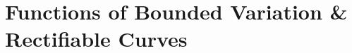 

\def\upint{\mathchoice%
    {\mkern13mu\overline{\vphantom{\intop}\mkern7mu}\mkern-20mu}%
    {\mkern7mu\overline{\vphantom{\intop}\mkern7mu}\mkern-14mu}%
    {\mkern7mu\overline{\vphantom{\intop}\mkern7mu}\mkern-14mu}%
    {\mkern7mu\overline{\vphantom{\intop}\mkern7mu}\mkern-14mu}%
  \int}
\def\lowint{\mkern3mu\underline{\vphantom{\intop}\mkern7mu}\mkern-10mu\int}

\section{Functions of Bounded Variation \& Rectifiable Curves}
\setcounter{subsection}{1}
